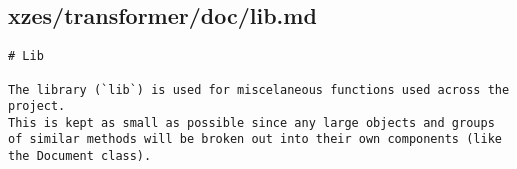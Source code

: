 \subsection{xzes/transformer/doc/lib.md}
\begin{lstlisting}
# Lib

The library (`lib`) is used for miscelaneous functions used across the project.
This is kept as small as possible since any large objects and groups of similar methods will be broken out into their own components (like the Document class).
\end{lstlisting}
